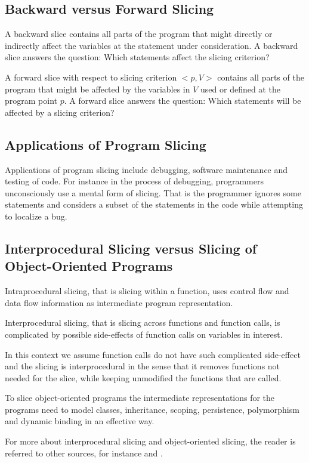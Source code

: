 \documentclass[11pt,a4paper,twoside]{article}
\begin{document}
\subsection{Backward versus Forward Slicing}
A backward slice contains all parts of the program that might directly or indirectly affect the variables at the statement under consideration. A backward slice answers the question: Which statements affect the slicing criterion?

A forward slice with respect to slicing criterion $<p,V>$ contains all parts of the program that might be affected by the variables in $V$ used or defined at the program point $p$. A forward slice answers the question: Which statements will be affected by a slicing criterion?

\subsection{Applications of Program Slicing}
Applications of program slicing include debugging, software maintenance and testing of code. For instance in the process of debugging, programmers unconsciously use a mental form of slicing. That is the programmer ignores some statements and considers a subset of the statements in the code while attempting to localize a bug.


\subsection{Interprocedural Slicing versus Slicing of Object-Oriented Programs}

Intraprocedural slicing, that is slicing within a function, uses control flow and data flow information as intermediate program representation.

Interprocedural slicing, that is slicing across functions and function calls, is complicated by possible side-effects of function calls on variables in interest.

In this context we assume function calls do not have such complicated side-effect and the slicing is interprocedural in the sense that it removes functions not needed for the slice, while keeping unmodified the functions that are called.

To slice object-oriented programs the intermediate representations for the programs need to model classes, inheritance, scoping, persistence, polymorphism and dynamic binding in an effective way.

For more about interprocedural slicing and object-oriented slicing, the reader is referred to other sources, for instance \cite{chp8} and \cite{OO}.
\end{document}
